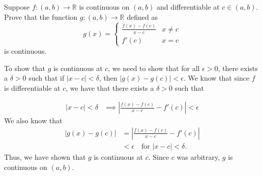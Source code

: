 \documentclass[answers,12pt,addpoints]{exam}
\begin{document}
\begin{questions}

\question Suppose \( f : (a, b) \to \mathbb{R} \) is continuous on \( (a, b) \) and differentiable at \( c \in (a, b) \). Prove that the function \( g : (a, b) \to \mathbb{R} \) defined as
\[
g(x) = 
\begin{cases} 
\frac{f(x) - f(c)}{x - c} & x \neq c \\ 
f'(c) & x = c 
\end{cases}
\]
is continuous.
\begin{solution}
To show that \( g \) is continuous at \( c \), we need to show that for all \( \epsilon > 0 \), there exists a \( \delta > 0 \) such that if \( |x - c| < \delta \), then \( |g(x) - g(c)| < \epsilon \).
We know that since \( f \) is differentiable at \( c \), we have that there exists a $\delta > 0$
    such that

    \begin{align*}
        |x-c| < \delta &\implies \left| \frac{f(x) - f(c)}{x - c} - f'(c) \right| < \epsilon 
    \end{align*}
We also know that
\begin{align*}
    |g(x) - g(c)| &= \left| \frac{f(x) - f(c)}{x - c} - f'(c) \right| \\
    &< \epsilon \quad \text{for } |x - c| < \delta.
\end{align*}
Thus, we have shown that \( g \) is continuous at \( c \). Since \( c \) was arbitrary, \( g \) is continuous on \( (a, b) \).
\end{solution}


\end{questions}
\end{document}
